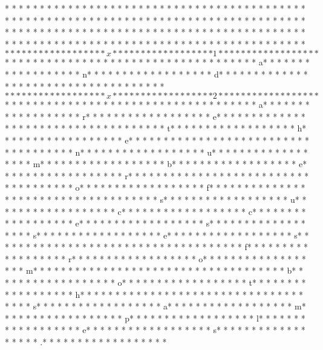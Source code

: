 * * *  * * *  * * *  *  * * *  *  * * *  * * *  * * *  *  * * *  *  * * *  * * *  * * *  *  * * *  *  * * *  *  * * *  * * *  * * *  *  * * *  *  * * *  *  * * *  * * *  * * *  *  * * *  *  * * *  *  * * *  * * *  * * *  *  * * *  *  * * *  *  * * *  * * *  * * *  *  * * *  *  * * *  *  * * *  * * *  * * *  *  * * *  *  * * *  *  * * *  * * *  * * *  *  * * *  *  * * *  *  * * *  * * *  * * *  *  * * *  *  * * *  * $* * *  * * *  * * *  *  * * *  *  * * *  * x* * *  * * *  * * *  *  * * *  *  * * *  * 1* * *  * * *  * * *  *  * * *  *  * * *  * $* * *  * * *  * * *  *  * * *  *  * * *  *  * * *  * * *  * * *  *  * * *  *  * * *  * a* * *  * * *  * * *  *  * * *  *  * * *  * n* * *  * * *  * * *  *  * * *  *  * * *  * d* * *  * * *  * * *  *  * * *  *  * * *  *  * * *  * * *  * * *  *  * * *  *  * * *  * $* * *  * * *  * * *  *  * * *  *  * * *  * x* * *  * * *  * * *  *  * * *  *  * * *  * 2* * *  * * *  * * *  *  * * *  *  * * *  * $* * *  * * *  * * *  *  * * *  *  * * *  *  * * *  * * *  * * *  *  * * *  *  * * *  * a* * *  * * *  * * *  *  * * *  *  * * *  * r* * *  * * *  * * *  *  * * *  *  * * *  * e* * *  * * *  * * *  *  * * *  *  * * *  *  * * *  * * *  * * *  *  * * *  *  * * *  * t* * *  * * *  * * *  *  * * *  *  * * *  * h* * *  * * *  * * *  *  * * *  *  * * *  * e* * *  * * *  * * *  *  * * *  *  * * *  *  * * *  * * *  * * *  *  * * *  *  * * *  * n* * *  * * *  * * *  *  * * *  *  * * *  * u* * *  * * *  * * *  *  * * *  *  * * *  * m* * *  * * *  * * *  *  * * *  *  * * *  * b* * *  * * *  * * *  *  * * *  *  * * *  * e* * *  * * *  * * *  *  * * *  *  * * *  * r* * *  * * *  * * *  *  * * *  *  * * *  *  * * *  * * *  * * *  *  * * *  *  * * *  * o* * *  * * *  * * *  *  * * *  *  * * *  * f* * *  * * *  * * *  *  * * *  *  * * *  *  * * *  * * *  * * *  *  * * *  *  * * *  * s* * *  * * *  * * *  *  * * *  *  * * *  * u* * *  * * *  * * *  *  * * *  *  * * *  * c* * *  * * *  * * *  *  * * *  *  * * *  * c* * *  * * *  * * *  *  * * *  *  * * *  * e* * *  * * *  * * *  *  * * *  *  * * *  * s* * *  * * *  * * *  *  * * *  *  * * *  * s* * *  * * *  * * *  *  * * *  *  * * *  * e* * *  * * *  * * *  *  * * *  *  * * *  * s* * *  * * *  * * *  *  * * *  *  * * *  *  * * *  * * *  * * *  *  * * *  *  * * *  * f* * *  * * *  * * *  *  * * *  *  * * *  * r* * *  * * *  * * *  *  * * *  *  * * *  * o* * *  * * *  * * *  *  * * *  *  * * *  * m* * *  * * *  * * *  *  * * *  *  * * *  *  * * *  * * *  * * *  *  * * *  *  * * *  * b* * *  * * *  * * *  *  * * *  *  * * *  * o* * *  * * *  * * *  *  * * *  *  * * *  * t* * *  * * *  * * *  *  * * *  *  * * *  * h* * *  * * *  * * *  *  * * *  *  * * *  *  * * *  * * *  * * *  *  * * *  *  * * *  * s* * *  * * *  * * *  *  * * *  *  * * *  * a* * *  * * *  * * *  *  * * *  *  * * *  * m* * *  * * *  * * *  *  * * *  *  * * *  * p* * *  * * *  * * *  *  * * *  *  * * *  * l* * *  * * *  * * *  *  * * *  *  * * *  * e* * *  * * *  * * *  *  * * *  *  * * *  * s* * *  * * *  * * *  *  * * *  *  * * *  * .* * *  * * *  * * *  *  * * *  *  * * *  * 
